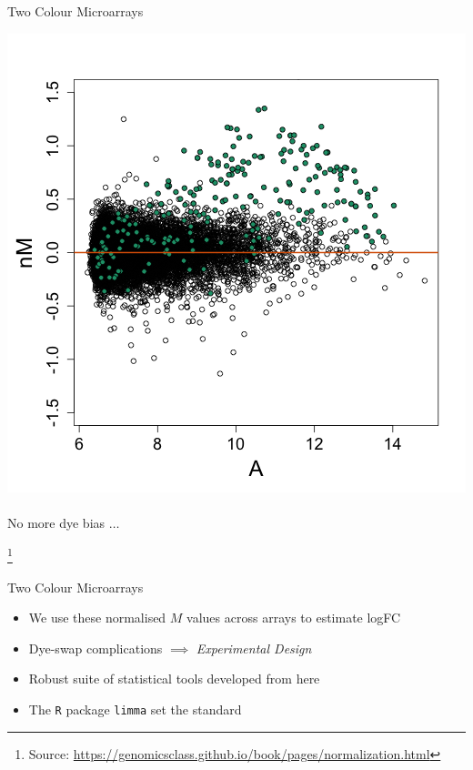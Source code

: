 \documentclass[aspectratio=169,11pt]{beamer}
\newcommand\blfootnote[1]{%
  \begingroup
  \renewcommand\thefootnote{}\footnote{#1}%
  \addtocounter{footnote}{-1}%
  \endgroup
}
\begin{document}
\begin{frame}{Two Colour Microarrays}

	\begin{center}
		\includegraphics[scale=0.3]{figures/MA_plot_loess_norm.png} 
		~\\
		No more dye bias $\ldots$
	\end{center}

\blfootnote{Source: \url{https://genomicsclass.github.io/book/pages/normalization.html}}	


\end{frame}


\begin{frame}{Two Colour Microarrays}

	\begin{itemize}
		\item We use these normalised $M$ values across arrays to estimate logFC 
		\item Dye-swap complications $\implies$ \textit{Experimental Design}
		\item Robust suite of statistical tools developed from here
		\item The \texttt{R} package \texttt{limma} set the standard
	\end{itemize}

\end{frame}
\end{document}
